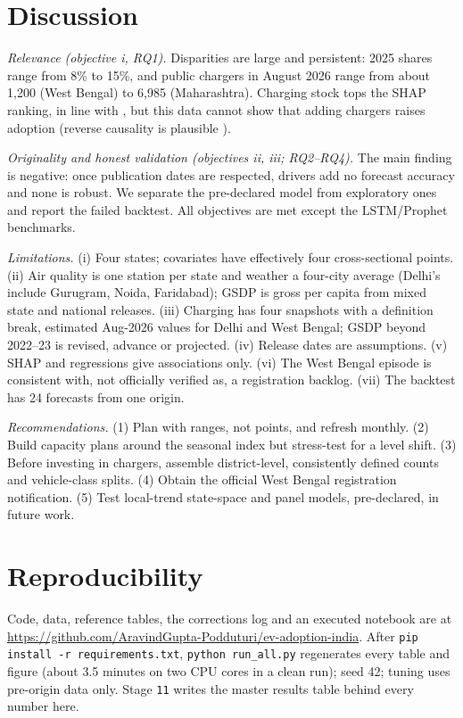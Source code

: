 \section{Discussion}\label{sec:disc}
\textit{Relevance (objective i, RQ1).} Disparities are large and persistent: 2025 shares range from 8\% to 15\%, and public chargers in August 2026 range from about 1{,}200 (West Bengal) to 6{,}985 (Maharashtra). Charging stock tops the SHAP ranking, in line with \cite{sierzchula}, but this data cannot show that adding chargers raises adoption (reverse causality is plausible \cite{li}).

\textit{Originality and honest validation (objectives ii, iii; RQ2--RQ4).} The main finding is negative: once publication dates are respected, drivers add no forecast accuracy and none is robust. We separate the pre-declared model from exploratory ones and report the failed backtest. All objectives are met except the LSTM/Prophet benchmarks.

\textit{Limitations.} (i) Four states; covariates have effectively four cross-sectional points. (ii) Air quality is one station per state and weather a four-city average (Delhi's include Gurugram, Noida, Faridabad); GSDP is gross per capita from mixed state and national releases. (iii) Charging has four snapshots with a definition break, estimated Aug-2026 values for Delhi and West Bengal; GSDP beyond 2022--23 is revised, advance or projected. (iv) Release dates are assumptions. (v) SHAP and regressions give associations only. (vi) The West Bengal episode is consistent with, not officially verified as, a registration backlog. (vii) The backtest has 24 forecasts from one origin.

\textit{Recommendations.} (1) Plan with ranges, not points, and refresh monthly. (2) Build capacity plans around the seasonal index but stress-test for a level shift. (3) Before investing in chargers, assemble district-level, consistently defined counts and vehicle-class splits. (4) Obtain the official West Bengal registration notification. (5) Test local-trend state-space and panel models, pre-declared, in future work.

\section{Reproducibility}
Code, data, reference tables, the corrections log and an executed notebook are at \url{https://github.com/AravindGupta-Podduturi/ev-adoption-india}. After \texttt{pip install -r requirements.txt}, \texttt{python run\_all.py} regenerates every table and figure (about 3.5 minutes on two CPU cores in a clean run); seed 42; tuning uses pre-origin data only. Stage \texttt{11} writes the master results table behind every number here.

